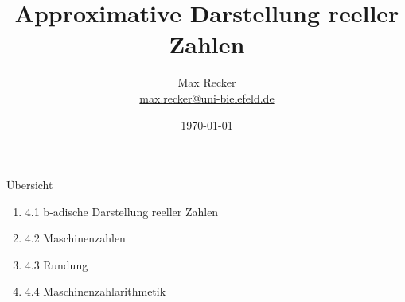 \documentclass{article}
\title{Approximative Darstellung reeller Zahlen}
\date{\today} %
\author{Max Recker\\ \url{max.recker@uni-bielefeld.de}}
\begin{document}
\begin{frame}
    \titlepage
\end{frame}

\begin{frame}{Übersicht}
    \begin{enumerate}
        \item 4.1 b-adische Darstellung reeller Zahlen
        \item 4.2 Maschinenzahlen
        \item 4.3 Rundung
        \item 4.4 Maschinenzahlarithmetik
    \end{enumerate}

    
\end{frame}
\end{document}
